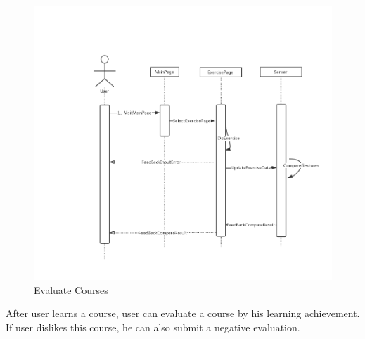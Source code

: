 \documentclass[16pt]{scrreprt}
\begin{document}
\begin{figure}[H]
    \includegraphics[width=\linewidth]{./FuncPhoto/17.png}   
    \caption{Evaluate Courses}
\end{figure}
After user learns a course, user can evaluate a course by his learning achievement. If user dislikes this course, he can also submit a negative evaluation.
\end{document}
